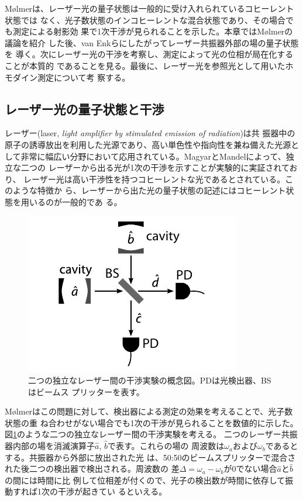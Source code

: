 \documentclass[10pt]{jsarticle}
\newcommand{\ope}[1]{\hat{#1}}
\begin{document}
M{\o}lmerは、レーザー光の量子状態は一般的に受け入れられているコヒーレント状態では
なく、光子数状態のインコヒーレントな混合状態であり、その場合でも測定による射影効
果で1次干渉が見られることを示した\cite{Molmer1997}。本章ではM{\o}lmerの議論を紹介
した後、van Enkら\cite{vanEnk2002}にしたがってレーザー共振器外部の場の量子状態を
導く。次にレーザー光の干渉を考察し、測定によって光の位相が局在化することが本質的
であることを見る。最後に、レーザー光を参照光として用いたホモダイン測定について考
察する。

\subsection{レーザー光の量子状態と干渉}
\label{sec:molmer-interference}

レーザー(laser, \textit{light amplifier by stimulated emission of radiation})は共
振器中の原子の誘導放出を利用した光源であり、高い単色性や指向性を兼ね備えた光源と
して非常に幅広い分野において応用されている。MagyarとMandelによって、独立な二つの
レーザーから出る光が1次の干渉を示すことが実験的に実証されており\cite{Magyar1963}、
レーザー光は高い干渉性を持つコヒーレントな光であるとされている。このような特徴か
ら、レーザーから出た光の量子状態の記述にはコヒーレント状態を用いるのが一般的であ
る。

\begin{figure}[htbp]
  \centering
  \includegraphics{molmer-interference.pdf}
  \caption{二つの独立なレーザー間の干渉実験の概念図。PDは光検出器、BSはビームス
    プリッターを表す。}
  \label{fig:indep-interference}
\end{figure}

M{\o}lmerはこの問題に対して、検出器による測定の効果を考えることで、光子数状態の重
ね合わせがない場合でも1次の干渉が見られることを数値的に示した\cite{Molmer1997}。
図\ref{fig:indep-interference}のような二つの独立なレーザー間の干渉実験を考える。
二つのレーザー共振器内部の場を消滅演算子$\ope{a}$, $\ope{b}$で表す。これらの場の
周波数は$\omega_a$および$\omega_b$であるとする。共振器から外部に放出された光
は、50:50のビームスプリッターで混合された後二つの検出器で検出される。周波数の
差$\Delta = \omega_a - \omega_b$が0でない場合$\ope{a}$と$\ope{b}$の間には時間に比
例して位相差が付くので、光子の検出数が時間に依存して振動すれば1次の干渉が起きてい
るといえる。
\end{document}
